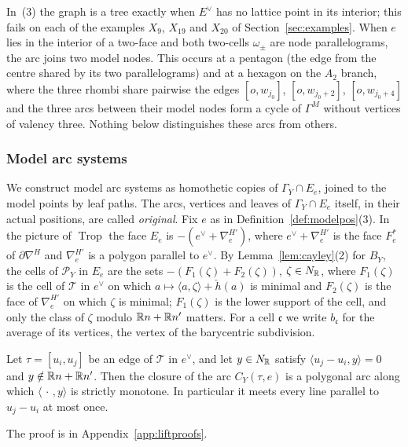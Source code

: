 In~(3) the graph is a tree exactly when $E^\vee$ has no lattice point in its interior; this fails on each of the
examples $X_9$, $X_{19}$ and $X_{20}$ of Section~\ref{sec:examples}. When $e$ lies in the interior of a two-face and both two-cells
$\omega_\pm$ are node parallelograms, the arc joins two model nodes. This occurs at a pentagon (the edge from the centre
shared by its two parallelograms) and at a hexagon on the $A_2$ branch, where the three rhombi share pairwise the edges
$[o,w_{j_0}]$, $[o,w_{j_0+2}]$, $[o,w_{j_0+4}]$ and the three arcs between their model nodes form a cycle of $\Gamma^M$
without vertices of valency three. Nothing below distinguishes these arcs from others.

\subsubsection*{Model arc systems}
We construct model arc systems as homothetic copies of $\Gamma_Y\cap E_e$, joined to the model points by leaf paths. The
arcs, vertices and leaves of $\Gamma_Y\cap E_e$ itself, in their actual positions, are called \emph{original}. Fix $e$ as
in Definition~\ref{def:modelpos}(3). In the picture of $\operatorname{Trop}$ the face $E_e$ is
$-(e^\vee+\nabla^{H'}_e)$, where $e^\vee+\nabla^{H'}_e$ is the face $F^*_e$ of $\partial\nabla^H$ and $\nabla^{H'}_e$ is a
polygon parallel to $e^\vee$. By Lemma~\ref{lem:cayley}(2) for $B_Y$, the cells of $\mathscr P_Y$ in $E_e$ are the sets
$-(F_1(\zeta)+F_2(\zeta))$, $\zeta\in N_\mathbb R$, where $F_1(\zeta)$ is the cell of $\mathcal T$ in $e^\vee$ on which
$a\mapsto\langle a,\zeta\rangle+\check h(a)$ is minimal and $F_2(\zeta)$ is the face of $\nabla^{H'}_e$ on which $\zeta$
is minimal; $F_1(\zeta)$ is the lower support of the cell, and only the class of $\zeta$ modulo $\mathbb R n+\mathbb R n'$ matters. For
a cell $\mathfrak c$ we write $b_{\mathfrak c}$ for the average of its vertices, the vertex of the barycentric subdivision.

\begin{lemma}\label{lem:litarcs}
Let $\tau=[u_i,u_j]$ be an edge of $\mathcal T$ in $e^\vee$, and let $y\in N_\mathbb R$ satisfy $\langle u_j-u_i,y\rangle=0$ and
$y\notin\mathbb R n+\mathbb R n'$. Then the closure of the arc $C_Y(\tau,e)$ is a polygonal arc along which $\langle\,\cdot\,,y\rangle$
is strictly monotone. In particular it meets every line parallel to $u_j-u_i$ at most once.
\end{lemma}

The proof is in Appendix~\ref{app:liftproofs}.

